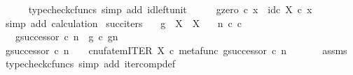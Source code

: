 \begin{isabellebody}
\ \ \ \ \isamarkupfalse%
\ {\isacharparenleft}{\kern0pt}typecheck{\isacharunderscore}{\kern0pt}cfuncs{\isacharcomma}{\kern0pt}\ simp\ add{\isacharcolon}{\kern0pt}\ id{\isacharunderscore}{\kern0pt}left{\isacharunderscore}{\kern0pt}unit{}{\isacharparenright}{\kern0pt}\isanewline
\ \ \isamarkupfalse%
\ \isamarkupfalse%
\ {\isachardoublequoteopen}{\isacharparenleft}{\kern0pt}g\isactrlbsup {\isasymcirc}zero\isactrlesup {\isacharparenright}{\kern0pt}\ {\isasymcirc}\isactrlsub c\ x\ {\isacharequal}{\kern0pt}\ id\isactrlsub c\ X\ {\isasymcirc}\isactrlsub c\ x{\isachardoublequoteclose}\isanewline
\ \ \ \ \isamarkupfalse%
\ {\isacharparenleft}{\kern0pt}simp\ add{\isacharcolon}{\kern0pt}\ calculation{\isacharparenright}{\kern0pt}\isanewline
{}\isamarkupfalse%
%
\endisatagproof
{\isafoldproof}%
%
\isadelimproof
\isanewline
%
\endisadelimproof
\isanewline
{}\isamarkupfalse%
\ succ{\isacharunderscore}{\kern0pt}iters{\isacharcolon}{\kern0pt}\isanewline
\ \ \ {\isachardoublequoteopen}g\ {\isacharcolon}{\kern0pt}\ X\ {\isasymrightarrow}\ X{\isachardoublequoteclose}\isanewline
\ \ \ {\isachardoublequoteopen}n\ {\isasymin}\isactrlsub c\ {\isasymnat}\isactrlsub c{\isachardoublequoteclose}\isanewline
\ \ \ {\isachardoublequoteopen}g\isactrlbsup {\isasymcirc}{\isacharparenleft}{\kern0pt}successor\ {\isasymcirc}\isactrlsub c\ n{\isacharparenright}{\kern0pt}\isactrlesup \ {\isacharequal}{\kern0pt}\ g\ {\isasymcirc}\isactrlsub c\ {\isacharparenleft}{\kern0pt}g\isactrlbsup {\isasymcirc}n\isactrlesup {\isacharparenright}{\kern0pt}{\isachardoublequoteclose}\ \ \ \ \isanewline
%
\isadelimproof
%
\endisadelimproof
%
\isatagproof
{}\isamarkupfalse%
\ {\isacharminus}{\kern0pt}\ \isanewline
\ \ \isamarkupfalse%
\ {\isachardoublequoteopen}g\isactrlbsup {\isasymcirc}successor\ {\isasymcirc}\isactrlsub c\ n\isactrlesup \ \ \ {\isacharequal}{\kern0pt}\ cnufatem{\isacharparenleft}{\kern0pt}ITER\ X\ {\isasymcirc}\isactrlsub c\ {\isasymlangle}metafunc\ g{\isacharcomma}{\kern0pt}successor\ {\isasymcirc}\isactrlsub c\ n\ {\isasymrangle}{\isacharparenright}{\kern0pt}{\isachardoublequoteclose}\isanewline
\ \ \ \ \isamarkupfalse%
\ assms\ \isamarkupfalse%
\ {\isacharparenleft}{\kern0pt}typecheck{\isacharunderscore}{\kern0pt}cfuncs{\isacharcomma}{\kern0pt}\ simp\ add{\isacharcolon}{\kern0pt}\ iter{\isacharunderscore}{\kern0pt}comp{\isacharunderscore}{\kern0pt}def{}{\isacharparenright}{\kern0pt}\isanewline

\end{isabellebody}
